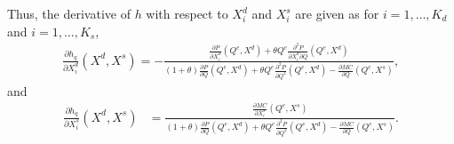 \documentclass[11pt, a4paper]{article}
\theoremstyle{remark}
\begin{document}
Thus, the derivative of $h$ with respect to $X^{d}_i$ and $X^{s}_i$ are given as for $i = 1, \ldots, K_d$ and $i = 1, \ldots, K_s$,
\begin{align}
    \frac{\partial h_q}{\partial X^{d}_{i}}(X^{d}, X^{s}) = -\frac{\frac{\partial P}{\partial X^{d}_{i}}(Q^e, X^{d}) + \theta Q^e \frac{\partial^2 P}{\partial X^{d}_{i}\partial Q}(Q^e, X^{d}) }{(1+\theta)\frac{\partial P}{\partial Q}(Q^e, X^{d}) + \theta  Q^e\frac{\partial^2 P}{\partial Q^2}(Q^e, X^{d}) - \frac{\partial MC}{\partial Q}(Q^e, X^{s})}, \label{eq:foc_derivative_demand}
\end{align}
and
\begin{align}
    \frac{\partial h_q}{\partial X^{s}_{i}}(X^{d}, X^{s}) & = \frac{\frac{\partial MC}{\partial X^{s}_{i}}(Q^e, X^{s})}{(1+\theta)\frac{\partial P}{\partial Q}(Q^e, X^{d}) + \theta  Q^e\frac{\partial^2 P}{\partial Q^2}(Q^e, X^{d}) - \frac{\partial MC}{\partial Q}(Q^e, X^{s})}. \label{eq:foc_derivative_supply}
\end{align}
\end{document}
